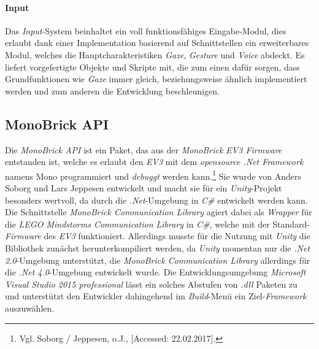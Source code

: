\paragraph*{Input}
Das \textit{Input}-System beinhaltet ein voll funktionsfähiges Eingabe-Modul, dies erlaubt dank einer Implementation basierend auf Schnittstellen ein erweiterbares Modul, welches die Hauptcharakteristiken \textit{Gaze}, \textit{Gesture} und \textit{Voice} abdeckt. Es liefert vorgefertigte Objekte und Skripte mit, die zum einen dafür sorgen, dass Grundfunktionen wie \textit{Gaze} immer gleich, beziehungsweise ähnlich implementiert werden und zum anderen die Entwicklung beschleunigen.
\subsection{MonoBrick API}\label{ssec:monoBrick}
Die \textit{MonoBrick API} ist ein Paket, das aus der \textit{MonoBrick EV3 Firmware} entstanden ist, welche es erlaubt den \textit{EV3} mit dem \textit{opensource .Net Framework} namens {Mono} programmiert und \textit{debuggt} werden kann.\footnote{ Vgl. Soborg / Jeppesen, o.J., [Accessed: 22.02.2017].} Sie wurde von Anders Soborg und Lars Jeppesen entwickelt und macht sie für ein \textit{Unity}-Projekt besonders wertvoll, da durch die \textit{.Net}-Umgebung in \textit{C\#} entwickelt werden kann. Die Schnittstelle \textit{MonoBrick Communication Library} agiert dabei als \textit{Wrapper} für die \textit{LEGO Mindstorms Communication Library} in \textit{C\#}, welche mit der Standard-\textit{Firmware} des \textit{EV3} funktioniert. Allerdings musste für die Nutzung mit \textit{Unity} die Bibliothek zunächst herunterkompiliert werden, da \textit{Unity} momentan nur die \textit{.Net 2.0}-Umgebung unterstützt, die \textit{MonoBrick Communication Library} allerdings für die \textit{.Net 4.0}-Umgebung entwickelt wurde. Die Entwicklungsumgebung \textit{Microsoft Visual Studio 2015 professional} lässt ein solches Abstufen von \textit{.dll} Paketen zu und unterstützt den Entwickler dahingehend im \textit{Build}-Menü ein Ziel-\textit{Framework} auszuwählen.